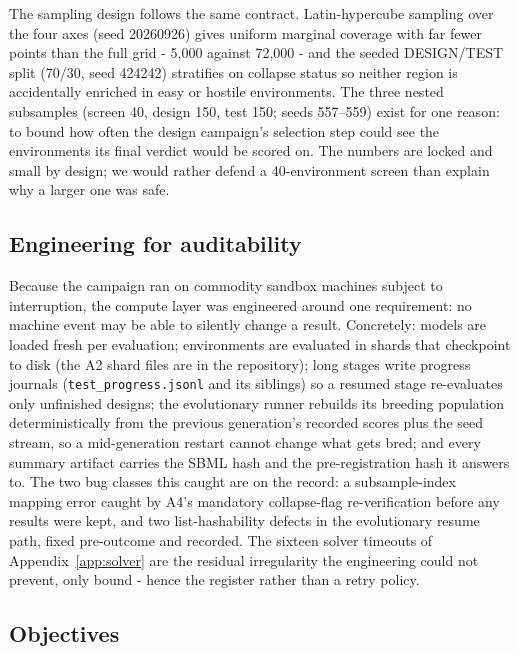 \documentclass[12pt]{article}
\begin{document}
The sampling design follows the same contract. Latin-hypercube
sampling over the four axes (seed 20260926) gives uniform marginal
coverage with far fewer points than the full grid - 5{,}000 against
72{,}000 - and the seeded DESIGN/TEST split (70/30, seed 424242)
stratifies on collapse status so neither region is accidentally
enriched in easy or hostile environments. The three nested subsamples
(screen 40, design 150, test 150; seeds 557--559) exist for one
reason: to bound how often the design campaign's selection step could
see the environments its final verdict would be scored on. The
numbers are locked and small by design; we would rather defend a
40-environment screen than explain why a larger one was safe.

\subsection{Engineering for auditability}

Because the campaign ran on commodity sandbox machines subject to
interruption, the compute layer was engineered around one requirement:
no machine event may be able to silently change a result. Concretely:
models are loaded fresh per evaluation; environments are evaluated in
shards that checkpoint to disk (the A2 shard files are in the
repository); long stages write progress journals
(\texttt{test\_progress.jsonl} and its siblings) so a resumed stage
re-evaluates only unfinished designs; the evolutionary runner rebuilds
its breeding population deterministically from the previous
generation's recorded scores plus the seed stream, so a mid-generation
restart cannot change what gets bred; and every summary artifact
carries the SBML hash and the pre-registration hash it answers to.
The two bug classes this caught are on the record: a subsample-index
mapping error caught by A4's mandatory collapse-flag re-verification
before any results were kept, and two list-hashability defects in the
evolutionary resume path, fixed pre-outcome and recorded. The sixteen
solver timeouts of Appendix~\ref{app:solver} are the residual
irregularity the engineering could not prevent, only bound - hence
the register rather than a retry policy.

\subsection{Objectives}
\label{sec:objectives}
\end{document}
